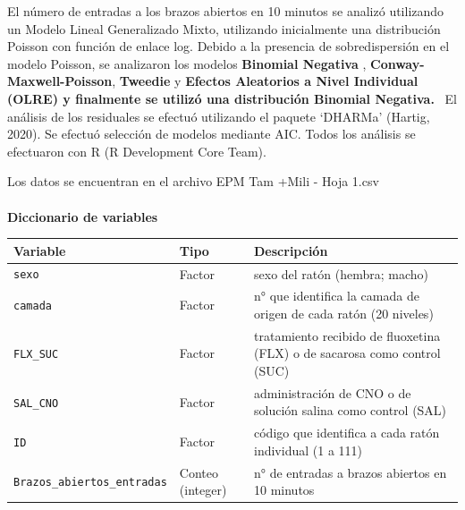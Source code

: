 \documentclass[
  letterpaper,
  DIV=11,
  numbers=noendperiod]{scrartcl}
\makeatletter
\let\oldparagraph\paragraph
\renewcommand{\paragraph}{
    \@ifstar
      \xxxParagraphStar
      \xxxParagraphNoStar
  }
\newcommand{\xxxParagraphStar}[1]{\oldparagraph*{#1}\mbox{}}
\newcommand{\xxxParagraphNoStar}[1]{\oldparagraph{#1}\mbox{}}
\newcounter{none} %
\makeatother
\begin{document}
El número de entradas a los brazos abiertos en 10 minutos se analizó
utilizando un Modelo Lineal Generalizado Mixto, utilizando inicialmente
una distribución Poisson con función de enlace log. Debido a la
presencia de sobredispersión en el modelo Poisson, se analizaron los
modelos \textbf{Binomial Negativa} , \textbf{Conway-Maxwell-Poisson},
\textbf{Tweedie} y \textbf{Efectos Aleatorios a Nivel Individual (OLRE)
y finalmente se utilizó una distribución Binomial Negativa.} ~El
análisis de los residuales se efectuó utilizando el paquete `DHARMa'
(Hartig, 2020). Se efectuó selección de modelos mediante AIC. Todos los
análisis se efectuaron con R (R Development Core Team).

Los datos se encuentran en el archivo EPM Tam +Mili - Hoja 1.csv

\paragraph{\texorpdfstring{\textbf{Diccionario de
variables}}{Diccionario de variables}}\label{diccionario-de-variables}

{\def\LTcaptype{none} %
\begin{longtable}[]{@{}
  >{\raggedright\arraybackslash}p{}
  >{\raggedright\arraybackslash}p{}
  >{\raggedright\arraybackslash}p{}@{}}
\toprule\noalign{}
\begin{minipage}[b]{\linewidth}\raggedright
Variable
\end{minipage} & \begin{minipage}[b]{\linewidth}\raggedright
Tipo
\end{minipage} & \begin{minipage}[b]{\linewidth}\raggedright
Descripción
\end{minipage} \\
\midrule\noalign{}
\endhead
\bottomrule\noalign{}
\endlastfoot
\texttt{sexo} & Factor & sexo del ratón (hembra; macho) \\
\texttt{camada} & Factor & n° que identifica la camada de origen de cada
ratón (20 niveles) \\
\texttt{FLX\_SUC} & Factor & tratamiento recibido de fluoxetina (FLX) o
de sacarosa como control (SUC) \\
\texttt{SAL\_CNO} & Factor & administración de CNO o de solución salina
como control (SAL) \\
\texttt{ID} & Factor & código que identifica a cada ratón individual (1
a 111) \\
\texttt{Brazos\_abiertos\_entradas} & Conteo (integer) & n° de entradas
a brazos abiertos en 10 minutos \\
\end{longtable}
}
\end{document}
